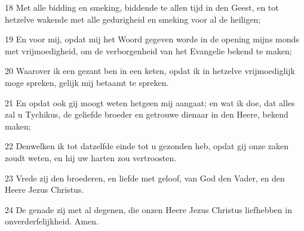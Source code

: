\par 18 Met alle bidding en smeking, biddende te allen tijd in den Geest, en tot hetzelve wakende met alle gedurigheid en smeking voor al de heiligen;
\par 19 En voor mij, opdat mij het Woord gegeven worde in de opening mijns monds met vrijmoedigheid, om de verborgenheid van het Evangelie bekend te maken;
\par 20 Waarover ik een gezant ben in een keten, opdat ik in hetzelve vrijmoediglijk moge spreken, gelijk mij betaamt te spreken.
\par 21 En opdat ook gij moogt weten hetgeen mij aangaat; en wat ik doe, dat alles zal u Tychikus, de geliefde broeder en getrouwe dienaar in den Heere, bekend maken;
\par 22 Denwelken ik tot datzelfde einde tot u gezonden heb, opdat gij onze zaken zoudt weten, en hij uw harten zou vertroosten.
\par 23 Vrede zij den broederen, en liefde met geloof, van God den Vader, en den Heere Jezus Christus.
\par 24 De genade zij met al degenen, die onzen Heere Jezus Christus liefhebben in onverderfelijkheid. Amen.



